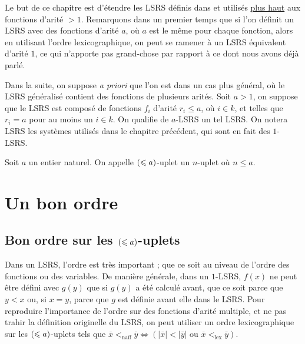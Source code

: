 		\label{rmq:choix_arites}
		Le but de ce chapitre est d'étendre les LSRS définis dans \cite{GrandjeanSchwentick2002} et utilisés \hyperref[def:LSRS]{plus haut} aux fonctions d'arité $>1$. Remarquons dans un premier temps que si l'on définit un LSRS avec des fonctions d'arité $a$, où $a$ est le même pour chaque fonction, alors en utilisant l'ordre lexicographique, on peut se ramener à un LSRS équivalent d'arité $1$, ce qui n'apporte pas grand-chose par rapport à ce dont nous avons déjà parlé.
		
		Dans la suite, on suppose \emph{a priori} que l'on est dans un cas plus général, où le LSRS généralisé contient des fonctions de plusieurs arités. Soit $a>1$, on suppose que le LSRS est composé de fonctions $f_i$ d'arité $r_i \leqslant a$, où $i \in k$, et telles que $r_i = a$ pour au moins un $i\in k$. On qualifie de $a$-LSRS un tel LSRS. On notera LSRS les systèmes utilisés dans le chapitre précédent, qui sont en fait des $1$-LSRS. 
		
		\begin{definition}
			Soit $a$ un entier naturel. On appelle $\left( \leqslant a \right)$-uplet un $n$-uplet où $n\leqslant a$. 
		\end{definition}

	
	
	\section{Un bon ordre} %
	\label{sec:ennuis_commencent}
	
		
		\subsection{Bon ordre sur les $\left( \leqslant a \right)$-uplets}
		\label{subsec:bon_ordre_uplets}
		
		Dans un LSRS, l'ordre est très important ; que ce soit au niveau de l'ordre des fonctions ou des variables. De manière générale, dans un $1$-LSRS, $f(x)$ ne peut être défini avec $g(y)$ que si $g(y)$ a été calculé avant, que ce soit parce que $y<x$ ou, si $x=y$, parce que $g$ est définie avant elle dans le LSRS. 
		Pour reproduire l'importance de l'ordre sur des fonctions d'arité multiple, et ne pas trahir la définition originelle du LSRS, on peut utiliser un ordre lexicographique sur les $\left( \leqslant a \right)$-uplets tels que $\overline{x} <_{\text{naïf}} \bar{y} \Leftrightarrow \left(\left|\overline{x}\right| < \left|\bar{y}\right| \text{ ou } \overline{x} <_{\text{lex}} \bar{y}\right)$.
			
